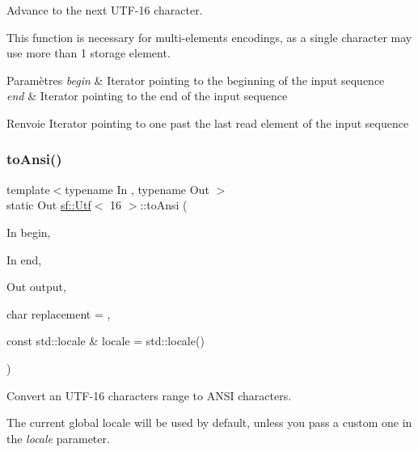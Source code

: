Advance to the next U\+T\+F-\/16 character. 

This function is necessary for multi-\/elements encodings, as a single character may use more than 1 storage element.


\begin{DoxyParams}{Paramètres}
{\em begin} & Iterator pointing to the beginning of the input sequence \\
\hline
{\em end} & Iterator pointing to the end of the input sequence\\
\hline
\end{DoxyParams}
\begin{DoxyReturn}{Renvoie}
Iterator pointing to one past the last read element of the input sequence 
\end{DoxyReturn}
\mbox{\label{classsf_1_1Utf_3_0116_01_4_a6d2bfbdfe46364bd49bca28a410b18f7}} 
\subsubsection{\texorpdfstring{to\+Ansi()}{toAnsi()}}
{\footnotesize\ttfamily template$<$typename In , typename Out $>$ \\
static Out \hyperlink{classsf_1_1Utf}{sf\+::\+Utf}$<$ 16 $>$\+::to\+Ansi (\begin{DoxyParamCaption}\item[{In}]{begin,  }\item[{In}]{end,  }\item[{Out}]{output,  }\item[{char}]{replacement = {},  }\item[{const std\+::locale \&}]{locale = {\ttfamily std\+:\+:locale()} }\end{DoxyParamCaption})\hspace{0.3cm}{\ttfamily [static]}}



Convert an U\+T\+F-\/16 characters range to A\+N\+SI characters. 

The current global locale will be used by default, unless you pass a custom one in the {\itshape locale} parameter.


